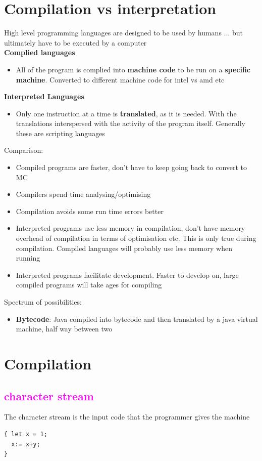 \documentclass{article}[18pt]
\begin{document}
\section{Compilation vs interpretation}
High level programming languages are designed to be used by humans ... but ultimately have to be executed by a computer\\
\textbf{Complied languages}
\begin{itemize}
\item All of the program is complied into \textbf{machine code} to be run on a \textbf{specific machine}. Converted to different machine code for intel vs amd etc 
\end{itemize}
\textbf{Interpreted Languages}
\begin{itemize}
\item Only one instruction at a time is \textbf{translated}, as it is needed. With the translations interspersed with the activity of the program itself. Generally these are scripting languages
\end{itemize}
Comparison:
\begin{itemize}
\item Compiled programs are faster, don't have to keep going back to convert to MC
\item Compilers spend time analysing/optimising
\item Compilation avoids some run time errors better
\item Interpreted programs use less memory in compilation, don't have memory overhead of compilation in terms of optimisation etc. This is only true during compilation. Compiled languages will probably use less memory when running
\item Interpreted programs facilitate development. Faster to develop on, large compiled programs will take ages for compiling
\end{itemize}
Spectrum of possibilities:
\begin{itemize}
\item \textbf{Bytecode}: Java compiled into bytecode and then translated by a java virtual machine, half way between two
\end{itemize}
\newpage
\section{Compilation}
\subsection{\textcolor{magenta}{character stream}}
The character stream is the input code that the programmer gives the machine
\begin{lstlisting}[mathescape=true]
{ let x = 1;
  x:= x+y;
}
\end{lstlisting}
\end{document}
